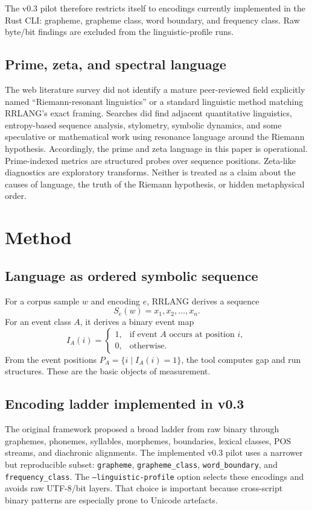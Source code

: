 \documentclass[11pt,a4paper]{article}
\newcommand{\RRLANG}{\textsc{RRLANG}}
\begin{document}
The v0.3 pilot therefore restricts itself to encodings currently implemented in the Rust CLI: grapheme, grapheme class, word boundary, and frequency class. Raw byte/bit findings are excluded from the linguistic-profile runs.

\subsection{Prime, zeta, and spectral language}
The web literature survey did not identify a mature peer-reviewed field explicitly named ``Riemann-resonant linguistics'' or a standard linguistic method matching \RRLANG{}'s exact framing. Searches did find adjacent quantitative linguistics, entropy-based sequence analysis, stylometry, symbolic dynamics, and some speculative or mathematical work using resonance language around the Riemann hypothesis. Accordingly, the prime and zeta language in this paper is operational. Prime-indexed metrics are structured probes over sequence positions. Zeta-like diagnostics are exploratory transforms. Neither is treated as a claim about the causes of language, the truth of the Riemann hypothesis, or hidden metaphysical order.


\section{Method}
\subsection{Language as ordered symbolic sequence}
For a corpus sample $w$ and encoding $e$, \RRLANG{} derives a sequence
\[
S_e(w) = x_1, x_2, \ldots, x_n.
\]
For an event class $A$, it derives a binary event map
\[
I_A(i)=\begin{cases}1, & \text{if event } A \text{ occurs at position } i,\\0, & \text{otherwise.}\end{cases}
\]
From the event positions $P_A=\{i\mid I_A(i)=1\}$, the tool computes gap and run structures. These are the basic objects of measurement.

\subsection{Encoding ladder implemented in v0.3}
The original framework proposed a broad ladder from raw binary through graphemes, phonemes, syllables, morphemes, boundaries, lexical classes, POS streams, and diachronic alignments. The implemented v0.3 pilot uses a narrower but reproducible subset: \texttt{grapheme}, \texttt{grapheme\_class}, \texttt{word\_boundary}, and \texttt{frequency\_class}. The \texttt{--linguistic-profile} option selects these encodings and avoids raw UTF-8/bit layers. That choice is important because cross-script binary patterns are especially prone to Unicode artefacts.
\end{document}
